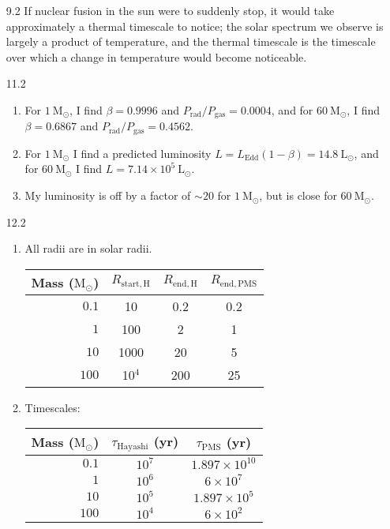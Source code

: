 \documentclass[11pt]{article}
\newcommand\lsol{\mathrm{L}_\odot}
\newcommand\msol{\mathrm{M}_\odot}
\begin{document}
\begin{enumerate}
\item [9.2]
    If nuclear fusion in the sun were to suddenly stop, it would take approximately a thermal timescale to notice; the solar spectrum we observe is largely a product of temperature, and the thermal timescale is the timescale over which a change in temperature would become noticeable.

\item [11.2]
	\begin{enumerate}
	
    \item For $1~\msol$, I find $\beta = 0.9996$ and $P_\mathrm{rad}/P_\mathrm{gas} = 0.0004$, and for $60~\msol$, I find $\beta = 0.6867$ and $P_\mathrm{rad}/P_\mathrm{gas} = 0.4562$.
    
    \item For $1~\msol$ I find a predicted luminosity $L = L_\mathrm{Edd}(1-\beta) = 14.8~\lsol$, and for $60~\msol$ I find $L = 7.14\times10^5~\lsol$.
    
    \item My luminosity is off by a factor of $\sim\!20$ for $1~\msol$, but is close for $60~\msol$.
    
    \end{enumerate}

\item [12.2] %
	\begin{enumerate}
    
    \item All radii are in solar radii.
    	\begin{table}[H]
        \centering
        \begin{tabular}{ r | c | c | c }
          Mass ($\msol$) & $R_\mathrm{start,H}$ & $R_\mathrm{end,H}$ & $R_\mathrm{end,PMS}$ \\ \hline
          $0.1$ & 10 & 0.2 & 0.2 \\
          $1$ & 100 & 2 & 1 \\
          $10$ & 1000 & 20 & 5 \\
          $100$ & 10$^4$ & 200 & 25 \\
        \end{tabular}
        \end{table}

	\item 
        Timescales:
    	\begin{table}[H]
        \centering
        \begin{tabular}{ r | c | c }
          Mass ($\msol$)  & $\tau_\mathrm{Hayashi}$ (yr) & $\tau_\mathrm{PMS}$ (yr) \\ \hline
          $0.1$ & $10^7$ & $1.897\times10^{10}$  \\
          $1$ & $10^6$ & $6\times10^{7}$  \\
          $10$ & $10^5$ & $1.897\times10^{5}$  \\
          $100$ & $10^4$ & $6\times10^{2}$ \\
        \end{tabular}
        \end{table}
    \end{enumerate}


\end{enumerate}
\end{document}
